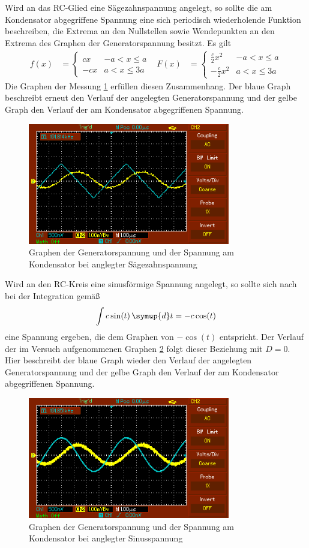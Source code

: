Wird an das RC-Glied eine Sägezahnspannung angelegt, so sollte die am Kondensator
abgegriffene Spannung eine sich periodisch wiederholende Funktion beschreiben, die
Extrema an den Nullstellen sowie Wendepunkten an den Extrema des Graphen der
Generatorspannung besitzt. Es gilt
\begin{align}
  f(x)&=
  \begin{cases}
    c x & -a<x\leq a\\
    -c x & a<x\leq 3a
  \end{cases}
  & F(x)&=
  \begin{cases}
    \frac{c}{2} x^2 & -a<x\leq a\\
    -\frac{c}{2} x^2 & a<x\leq 3a
  \end{cases}
\end{align}
Die Graphen der Messung \ref{fig:saegezahn} erfüllen diesen Zusammenhang.
Der blaue Graph beschreibt erneut den Verlauf der angelegten Generatorspannung und
der gelbe Graph den Verlauf der am Kondensator abgegriffenen Spannung.
\begin{figure}
  \centering
  \includegraphics[width=250pt]{data/integration_saegezahn.PNG}
  \caption{Graphen der Generatorspannung und der Spannung am Kondensator bei anglegter
  Sägezahnspannung}
  \label{fig:saegezahn}
\end{figure}


Wird an den RC-Kreis eine sinusförmige Spannung angelegt, so sollte sich nach bei der
Integration gemäß
\begin{equation}
  \int c\sin(t) \, \symup{d}t=-c\cos(t)
\end{equation}
eine Spannung ergeben, die dem Graphen von $-\cos(t)$ entspricht. Der Verlauf der
im Versuch aufgenommenen Graphen \ref{fig:sinus} folgt dieser Beziehung mit $D = 0$. Hier beschreibt der blaue Graph
wieder den Verlauf der angelegten Generatorspannung und der gelbe Graph den Verlauf der
am Kondensator abgegriffenen Spannung.
\begin{figure}
  \centering
  \includegraphics[width=250pt]{data/integration_sinus.PNG}
  \caption{Graphen der Generatorspannung und der Spannung am Kondensator bei anglegter
  Sinusspannung}
  \label{fig:sinus}
\end{figure}
